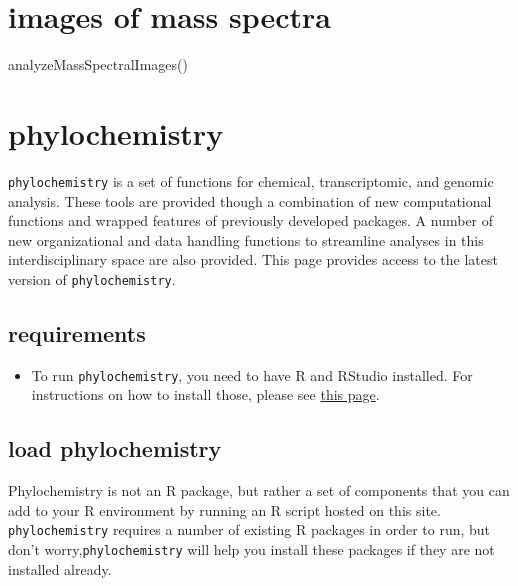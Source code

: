 \documentclass[
]{krantz}
\newenvironment{Shaded}{\begin{snugshade}}{\end{snugshade}}
\newcommand{\FunctionTok}[1]{\textcolor[rgb]{0.00,0.00,0.00}{#1}}
\newcommand{\NormalTok}[1]{#1}
\providecommand{\tightlist}{%
  \setlength{\itemsep}{0pt}\setlength{\parskip}{0pt}}
\begin{document}
\hypertarget{images-of-mass-spectra}{%
\section{images of mass spectra}\label{images-of-mass-spectra}}

\begin{Shaded}
\begin{Highlighting}[]
\FunctionTok{analyzeMassSpectralImages}\NormalTok{()}
\end{Highlighting}
\end{Shaded}

\hypertarget{phylochemistry-2}{%
\section{phylochemistry}\label{phylochemistry-2}}

\texttt{phylochemistry} is a set of functions for chemical, transcriptomic, and genomic analysis. These tools are provided though a combination of new computational functions and wrapped features of previously developed packages. A number of new organizational and data handling functions to streamline analyses in this interdisciplinary space are also provided. This page provides access to the latest version of \texttt{phylochemistry}.

\hypertarget{requirements}{%
\subsection{requirements}\label{requirements}}

\begin{itemize}
\tightlist
\item
  To run \texttt{phylochemistry}, you need to have R and RStudio installed. For instructions on how to install those, please see \href{https://thebustalab.github.io/R_For_Chemists/installation.html}{this page}.
\end{itemize}

\hypertarget{load-phylochemistry}{%
\subsection{load phylochemistry}\label{load-phylochemistry}}

Phylochemistry is not an R package, but rather a set of components that you can add to your R environment by running an R script hosted on this site. \texttt{phylochemistry} requires a number of existing R packages in order to run, but don't worry,\texttt{phylochemistry} will help you install these packages if they are not installed already.
\end{document}
